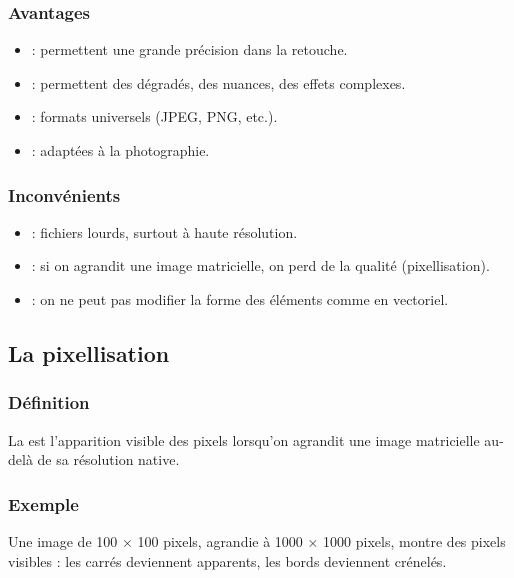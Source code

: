 \subsubsection{Avantages}

\begin{itemize}
    \item {} : permettent une grande précision dans la retouche.
    \item {} : permettent des dégradés, des nuances, des effets complexes.
    \item {} : formats universels (JPEG, PNG, etc.).
    \item {} : adaptées à la photographie.
\end{itemize}

\subsubsection{Inconvénients}

\begin{itemize}
    \item {} : fichiers lourds, surtout à haute résolution.
    \item {} : si on agrandit une image matricielle, on perd de la qualité (pixellisation).
    \item {} : on ne peut pas modifier la forme des éléments comme en vectoriel.
\end{itemize}

\subsection{La pixellisation}

\subsubsection{Définition}

La  est l'apparition visible des pixels lorsqu'on agrandit une image matricielle au-delà de sa résolution native.

\subsubsection{Exemple}

Une image de 100 × 100 pixels, agrandie à 1000 × 1000 pixels, montre des pixels visibles : les carrés deviennent apparents, les bords deviennent crénelés.

